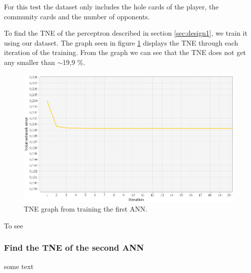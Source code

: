 For this test the dataset only includes the hole cards of the player, the community cards and the number of opponents.

To find the TNE of the perceptron described in section \ref{sec:design1}, we train it using our dataset. The graph seen in figure \ref{fig:tneg1} displays the TNE through each iteration of the training. From the graph we can see that the TNE does not get any smaller than $\sim$19,9 \%.

\begin{figure}[H]
  \center
    \includegraphics[scale=0.6]{images/nn/default-nn1-err.png}
  \caption{TNE graph from training the first ANN.\label{fig:tneg1}}
\end{figure}

To see 

\subsubsection{Find the TNE of the second ANN}
\label{sec:ann-test2}
some text

